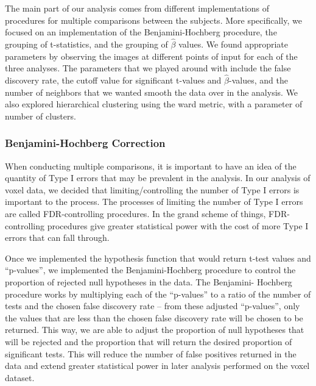 \par The main part of our analysis comes from different 
implementations of procedures for multiple comparisons between the subjects.
More specifically, we focused on an implementation of the Benjamini-Hochberg 
procedure, the grouping of t-statistics, and the grouping of $\hat{\beta}$ 
values. We found appropriate parameters by observing the images at different 
points of input for each of the three analyses. The parameters that we played 
around with include the false discovery rate, the cutoff value for significant 
t-values and $\hat{\beta}$-values, and the number of neighbors that we wanted 
smooth the data over in the analysis. We also explored hierarchical clustering
using the ward metric, with a parameter of number of clusters.

\subsubsection{Benjamini-Hochberg Correction}

\par When conducting multiple comparisons, it is important to have an 
idea of the quantity of Type I errors that may be prevalent in the analysis. 
In our analysis of voxel data, we decided that limiting/controlling the number 
of Type I errors is important to the process. The processes of limiting the 
number of Type I errors are called FDR-controlling procedures. In the grand 
scheme of things, FDR-controlling procedures give greater statistical power 
with the cost of more Type I errors that can fall through. 

\par Once we implemented the hypothesis function that would return t-test 
values and ``p-values'', we implemented the Benjamini-Hochberg procedure to 
control the proportion of rejected null hypotheses in the data. The Benjamini-
Hochberg procedure works by multiplying each of the ``p-values'' to a ratio of 
the number of tests and the chosen false discovery rate -- from these adjusted 
``p-values'', only the values that are less than the chosen false discovery 
rate will be chosen to be returned. This way, we are able to adjust the 
proportion of null hypotheses that will be rejected and the proportion that 
will return the desired proportion of significant tests. This will reduce the
number of false positives returned in the data and extend greater statistical 
power in later analysis performed on the voxel dataset.

